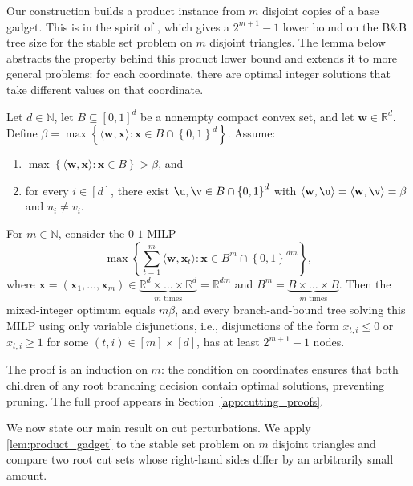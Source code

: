\documentclass[smallextended,envcountsect]{svjour3} %
\let\ACCu\u
\let\ACCv\v
\newcommand{\N}{\mathbb{N}}
\newcommand{\set}[1]{\left\{#1\right\}}
\newcommand{\R}{\mathbb{R}}
\newcommand{\x}{\mathbf{x}}
\newcommand{\w}{\mathbf{w}}
\renewcommand{\u}{\mathbf{u}}
\renewcommand{\v}{\mathbf{v}}
\newcommand{\0}{\mathbf{0}}
\newcommand{\1}{\mathbf{1}} %
\let\u\ACCu
\let\v\ACCv
\begin{document}
Our construction builds a product instance from $m$ disjoint copies of a base gadget.
This is in the spirit of \citet[Theorem~2.2]{basu2020complexity}, which gives a $2^{m+1}-1$ lower bound on the B\&B tree size for the stable set problem on $m$ disjoint triangles.
The lemma below abstracts the property behind this product lower bound and extends it to more general problems: for each coordinate, there are optimal integer solutions that take different values on that coordinate.

\begin{lemma}\label{lem:product_gadget}
	Let $d\in\N$, let $B\subseteq[0,1]^d$ be a nonempty compact convex set, and let $\w\in\R^d$.
	Define $\beta=\max\set{\langle\w,\x\rangle:\x\in B\cap\set{0,1}^d}$.
	Assume:
	\begin{enumerate}
		\item[(i)] $\max\set{\langle\w,\x\rangle:\x\in B}>\beta$, and
		\item[(ii)] for every $i\in[d]$, there exist $\u,\v\in B\cap\set{0,1}^d$ with $\langle\w,\u\rangle=\langle\w,\v\rangle=\beta$ and $u_i\neq v_i$.
	\end{enumerate}
	For $m\in\N$, consider the $0$-$1$ MILP
	\[
		\max\set{\sum_{t=1}^m\langle\w,\x_t\rangle:\x\in B^m\cap\set{0,1}^{dm}},
	\]
	where $\x=(\x_1,\dots,\x_m)\in\underbrace{\R^d \times \ldots \times \R^d}_{m \textrm{ times}}=\R^{dm}$ and $B^m = \underbrace{B \times \ldots \times B}_{m \textrm{ times}}$.
		Then the mixed-integer optimum equals $m\beta$, and every branch-and-bound tree solving this MILP using only variable disjunctions, i.e., disjunctions of the form $x_{t,i}\le 0$ or $x_{t,i}\ge 1$ for some $(t,i) \in [m] \times [d]$, has at least $2^{m+1}-1$ nodes. 
\end{lemma}

The proof is an induction on $m$: the condition on coordinates ensures that both children of any root branching decision contain optimal solutions, preventing pruning. The full proof appears in Section~\ref{app:cutting_proofs}.

We now state our main result on cut perturbations. We apply \cref{lem:product_gadget} to the stable set problem on $m$ disjoint triangles and compare two root cut sets whose right-hand sides differ by an arbitrarily small amount.
\end{document}
